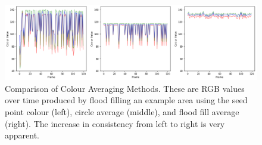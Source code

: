 \begin{figure}[H]
    \begin{center}
      \includegraphics[width=1\textwidth]{Figures/ColourConsistency.png}
      \caption[Comparison of Colour Averaging Methods]{Comparison of Colour Averaging Methods. These are RGB values over time produced by flood filling an example area using the seed point colour (left), circle average (middle), and flood fill average (right). The increase in consistency from left to right is very apparent.}
      \label{fig:ColourConsistency}
    \end{center}
\end{figure}